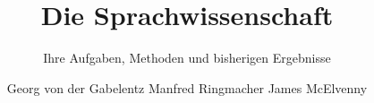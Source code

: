 \title{Die Sprachwissenschaft}  %
\subtitle{Ihre Aufgaben, Methoden und bisherigen Ergebnisse}
\BackBody{}
\author{Georg von der Gabelentz \newlineCover Manfred Ringmacher \newlineCover James McElvenny}
\renewcommand{\lsISBNdigital}{000-0-000000-00-0}
\renewcommand{\lsISBNhardcover}{000-0-000000-00-0}
\renewcommand{\lsISBNsoftcover}{000-0-000000-00-0}
\renewcommand{\lsSeries}{classics} %
\renewcommand{\lsSeriesNumber}{4} %
  
 